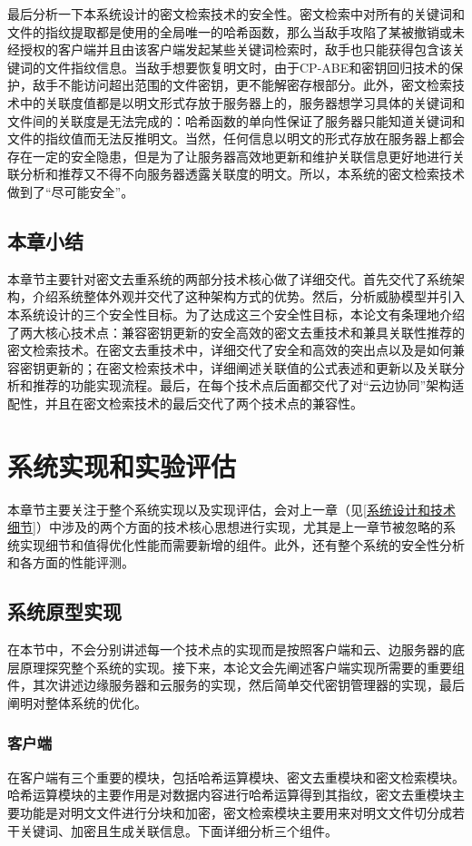 \documentclass[promaster]{thesis-uestc}
\begin{document}
最后分析一下本系统设计的密文检索技术的安全性。密文检索中对所有的关键词和文件的指纹提取都是使用的全局唯一的哈希函数，那么当敌手攻陷了某被撤销或未经授权的客户端并且由该客户端发起某些关键词检索时，敌手也只能获得包含该关键词的文件指纹信息。当敌手想要恢复明文时，由于CP-ABE和密钥回归技术的保护，敌手不能访问超出范围的文件密钥，更不能解密存根部分。此外，密文检索技术中的关联度值都是以明文形式存放于服务器上的，服务器想学习具体的关键词和文件间的关联度是无法完成的：哈希函数的单向性保证了服务器只能知道关键词和文件的指纹值而无法反推明文。当然，任何信息以明文的形式存放在服务器上都会存在一定的安全隐患，但是为了让服务器高效地更新和维护关联信息更好地进行关联分析和推荐又不得不向服务器透露关联度的明文。所以，本系统的密文检索技术做到了“尽可能安全”。

\section{本章小结}
本章节主要针对密文去重系统的两部分技术核心做了详细交代。首先交代了系统架构，介绍系统整体外观并交代了这种架构方式的优势。然后，分析威胁模型并引入本系统设计的三个安全性目标。为了达成这三个安全性目标，本论文有条理地介绍了两大核心技术点：兼容密钥更新的安全高效的密文去重技术和兼具关联性推荐的密文检索技术。在密文去重技术中，详细交代了安全和高效的突出点以及是如何兼容密钥更新的；在密文检索技术中，详细阐述关联值的公式表述和更新以及关联分析和推荐的功能实现流程。最后，在每个技术点后面都交代了对“云边协同”架构适配性，并且在密文检索技术的最后交代了两个技术点的兼容性。
\chapter{系统实现和实验评估}
本章节主要关注于整个系统实现以及实现评估，会对上一章（见\ref{系统设计和技术细节}）中涉及的两个方面的技术核心思想进行实现，尤其是上一章节被忽略的系统实现细节和值得优化性能而需要新增的组件。此外，还有整个系统的安全性分析和各方面的性能评测。

\section{系统原型实现}
在本节中，不会分别讲述每一个技术点的实现而是按照客户端和云、边服务器的底层原理探究整个系统的实现。接下来，本论文会先阐述客户端实现所需要的重要组件，其次讲述边缘服务器和云服务的实现，然后简单交代密钥管理器的实现，最后阐明对整体系统的优化。
\subsection{客户端}\label{客户端}
在客户端有三个重要的模块，包括哈希运算模块、密文去重模块和密文检索模块。哈希运算模块的主要作用是对数据内容进行哈希运算得到其指纹，密文去重模块主要功能是对明文文件进行分块和加密，密文检索模块主要用来对明文文件切分成若干关键词、加密且生成关联信息。下面详细分析三个组件。
\end{document}
